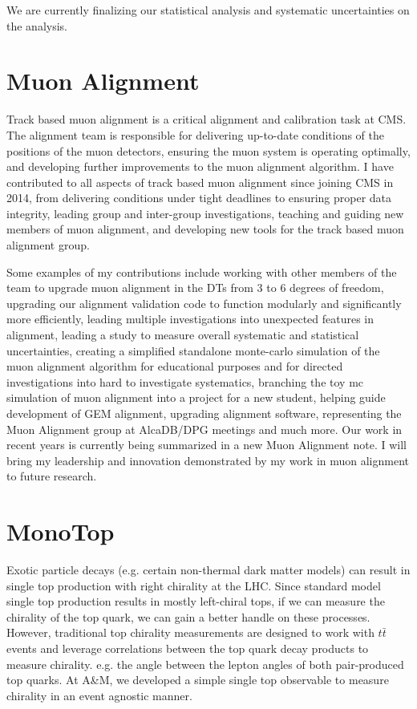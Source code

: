 \documentclass[11pt]{article}
\begin{document}
We are currently finalizing our statistical analysis and systematic uncertainties on the analysis. 

\section{Muon Alignment}

 Track based muon alignment is a critical alignment and calibration task at CMS. The alignment team is responsible for delivering up-to-date conditions of the positions of the muon detectors, ensuring the muon system is operating optimally, and developing further improvements to the muon alignment algorithm. I have contributed to all aspects of track based muon alignment since joining CMS in 2014, from delivering conditions under tight deadlines to ensuring proper data integrity, leading group and inter-group investigations, teaching and guiding new members of muon alignment, and developing new tools for the track based muon alignment group. 
 
 Some examples of my contributions include working with other members of the team to upgrade muon alignment in the DTs from 3 to 6 degrees of freedom, upgrading our alignment validation code to function modularly and significantly more efficiently, leading multiple investigations into unexpected features in alignment, leading a study to measure overall systematic and statistical uncertainties, creating a simplified standalone monte-carlo simulation of the muon alignment algorithm for educational purposes and for directed investigations into hard to investigate systematics, branching the toy mc simulation of muon alignment into a project for a new student, helping guide development of GEM alignment, upgrading alignment software, representing the Muon Alignment group at AlcaDB/DPG meetings and much more. Our work in recent years is currently being summarized in a new Muon Alignment note. I will bring my leadership and innovation demonstrated by my work in muon alignment to future research. 
 
 
 \section{MonoTop}
 
 Exotic particle decays (e.g. certain non-thermal dark matter models) can result in single top production with right chirality at the LHC. Since standard model single top production results in mostly left-chiral tops, if we can measure the chirality of the top quark, we can gain a better handle on these processes. However, traditional top chirality measurements are designed to work with $t\bar{t}$ events and leverage correlations between the top quark decay products to measure chirality. e.g. the angle between the lepton angles of both pair-produced top quarks. At A\&M, we developed a simple single top observable to measure chirality in an event agnostic manner.
 
\end{document}
